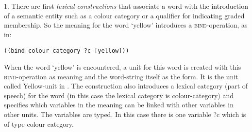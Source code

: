 1. There are first {\itshape lexical constructions} that associate a word with the introduction of a semantic entity  
such as a colour category or a qualifier for indicating graded membership. So the meaning for the word `yellow' 
introduces a \textsc{bind}-operation, as in: 
\begin{verbatim}
((bind colour-category ?c [yellow]))
\end{verbatim}
When the word `yellow' is encountered, a unit for this word is created with this \textsc{bind}-operation as meaning and the 
word-string itself as the form. It is the unit called Yellow-unit in . 
The construction also introduces a lexical category (part of speech) for the word (in this case the lexical category 
is colour-category) and specifies which variables in the meaning can be linked with other variables in other
units. The variables are typed. In this case there is one variable ?c which is of type colour-category. 

